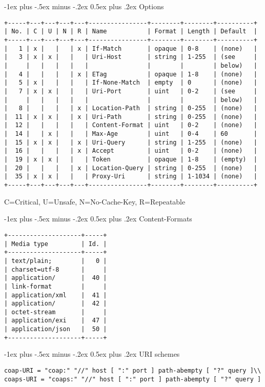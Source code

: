 \documentclass[10pt,landscape]{article}
\makeatletter
\renewcommand{\section}{\@startsection{section}{1}{0mm}%
                                {-1ex plus -.5ex minus -.2ex}%
                                {0.5ex plus .2ex}%
                                {\normalfont\large\bfseries}}
\makeatother
\begin{document}
\begin{multicols}{3}
\section{Options}
{\tiny
\begin{verbatim}
+-----+---+---+---+---+----------------+--------+--------+----------+
| No. | C | U | N | R | Name           | Format | Length | Default  |
+-----+---+---+---+---+----------------+--------+--------+----------+
|   1 | x |   |   | x | If-Match       | opaque | 0-8    | (none)   |
|   3 | x | x |   |   | Uri-Host       | string | 1-255  | (see     |
|     |   |   |   |   |                |        |        | below)   |
|   4 |   |   |   | x | ETag           | opaque | 1-8    | (none)   |
|   5 | x |   |   |   | If-None-Match  | empty  | 0      | (none)   |
|   7 | x | x |   |   | Uri-Port       | uint   | 0-2    | (see     |
|     |   |   |   |   |                |        |        | below)   |
|   8 |   |   |   | x | Location-Path  | string | 0-255  | (none)   |
|  11 | x | x |   | x | Uri-Path       | string | 0-255  | (none)   |
|  12 |   |   |   |   | Content-Format | uint   | 0-2    | (none)   |
|  14 |   | x |   |   | Max-Age        | uint   | 0-4    | 60       |
|  15 | x | x |   | x | Uri-Query      | string | 1-255  | (none)   |
|  16 |   |   |   | x | Accept         | uint   | 0-2    | (none)   |
|  19 | x | x |   |   | Token          | opaque | 1-8    | (empty)  |
|  20 |   |   |   | x | Location-Query | string | 0-255  | (none)   |
|  35 | x | x |   |   | Proxy-Uri      | string | 1-1034 | (none)   |
+-----+---+---+---+---+----------------+--------+--------+----------+
\end{verbatim}
C=Critical, U=Unsafe, N=No-Cache-Key, R=Repeatable
}

\section{Content-Formats}
{\tiny
\begin{verbatim}
+--------------------+-----+
| Media type         | Id. |
+--------------------+-----+
| text/plain;        |   0 |
| charset=utf-8      |     |
| application/       |  40 |
| link-format        |     |
| application/xml    |  41 |
| application/       |  42 |
| octet-stream       |     |
| application/exi    |  47 |
| application/json   |  50 |
+--------------------+-----+
\end{verbatim}
}

\section{URI schemes}
{\tiny
\begin{verbatim}
coap-URI = "coap:" "//" host [ ":" port ] path-abempty [ "?" query ]\\
coaps-URI = "coaps:" "//" host [ ":" port ] path-abempty [ "?" query ]
\end{verbatim}
}


\end{multicols}
\end{document}

